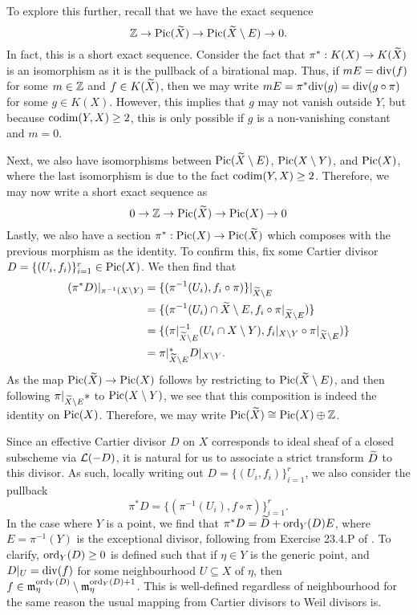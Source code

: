 To explore this further, recall that we have the exact sequence
\[
    \mathbb{Z} \to {\rm Pic}(\widetilde X) \to {\rm Pic}(\widetilde X \setminus E) \to 0.
\]
In fact, this is a short exact sequence.
Consider the fact that $\pi^* : K(X) \to K(\widetilde X)$ is an isomorphism as it is the pullback of a birational map.
Thus, if $mE = {\rm div}(f)$ for some $m \in \mathbb{Z}$ and $f \in K(\widetilde X)$,
then we may write $mE = \pi^*{\rm div}(g) = {\rm div}(g \circ \pi)$ for some $g \in K(X)$.
However, this implies that $g$ may not vanish outside $Y$,
but because ${\rm codim}(Y, X) \geq 2$,
this is only possible if $g$ is a non-vanishing constant and $m = 0$.

Next, we also have isomorphisms between ${\rm Pic}(\widetilde X \setminus E)$, ${\rm Pic}(X \setminus Y)$, and ${\rm Pic}(X)$,
where the last isomorphism is due to the fact ${\rm codim}(Y, X) \geq 2$.
Therefore, we may now write a short exact sequence as
\[
    0 \to \mathbb{Z} \to {\rm Pic}(\widetilde X) \to {\rm Pic}(X) \to 0
\]
Lastly, we also have a section $\pi^* : {\rm Pic}(X) \to {\rm Pic}(\widetilde X)$ which composes with the previous morphism as the identity.
To confirm this, fix some Cartier divisor $D = \{(U_i, f_i)\}_{i = 1}^r \in {\rm Pic}(X)$.
We then find that
\begin{align*}
    (\pi^* D)|_{\pi^{-1}(X \setminus Y)}
    & = \{(\pi^{-1}(U_i), f_i \circ \pi)\}|_{\widetilde X \setminus E} \\
    & = \{
            (
                \pi^{-1}(U_i) \cap \widetilde X \setminus E, 
                f_i \circ \pi|_{\widetilde X \setminus E}
            ) 
        \} \\
    & = \{
            (
                \pi|_{\widetilde X \setminus E}^{-1}(U_i \cap X \setminus Y),
                f_i|_{X \setminus Y} \circ \pi|_{\widetilde X \setminus E}
            )
        \} \\
    & = \pi|_{\widetilde X \setminus E}^* D|_{X \setminus Y}.
\end{align*}
As the map ${\rm Pic}(\widetilde X) \to {\rm Pic}(X)$ follows by restricting to ${\rm Pic}(\widetilde X \setminus E)$,
and then following $\pi|_{\widetilde X \setminus E}*$ to ${\rm Pic}(X \setminus Y)$,
we see that this composition is indeed the identity on ${\rm Pic}(X)$.
Therefore, we may write ${\rm Pic}(\widetilde X) \cong {\rm Pic}(X) \oplus \mathbb{Z}$.

Since an effective Cartier divisor $D$ on $X$ corresponds to ideal sheaf of a closed subscheme via $\mathcal{L}(-D)$, 
it is natural for us to associate a strict transform $\widetilde D$ to this divisor.
As such, locally writing out $D = \{(U_i, f_i)\}_{i = 1}^r$,
we also consider the pullback
\[
    \pi^*D = \{(\pi^{-1}(U_i), f \circ \pi)\}_{i = 1}^r.
\]
In the case where $Y$ is a point, 
we find that $\pi^*D = \widetilde D + {\rm ord}_Y(D) E$, where $E = \pi^{-1}(Y)$ is the exceptional divisor,
following from Exercise 23.4.P of \cite{Vakil_2022}. 
To clarify, ${\rm ord}_Y(D) \geq 0$ is defined such that if $\eta \in Y$ is the generic point,
and $D|_U = {\rm div}(f)$ for some neighbourhood $U \subseteq X$ of $\eta$,
then $f \in \mathfrak{m}_\eta^{{\rm ord}_Y(D)} \setminus \mathfrak{m}_\eta^{{\rm ord}_Y(D) + 1}$.
This is well-defined regardless of neighbourhood for the same reason the usual mapping from Cartier divisors to Weil divisors is.
 
